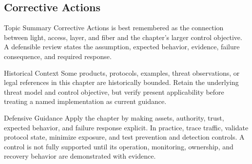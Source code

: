 \documentclass[11pt,letterpaper]{article}
\begin{document}
\subsection*{Corrective Actions}
\begin{CornellNotesTable}
\end{CornellNotesTable}
\begin{CornellSummaryBox}{Topic Summary}
Corrective Actions is best remembered as the connection between light, access, layer, and fiber and the chapter's larger control objective. A defensible review states the assumption, expected behavior, evidence, failure consequence, and required response.
\end{CornellSummaryBox}
\begin{CornellWarningBox}{Historical Context}
Some products, protocols, examples, threat observations, or legal references in this chapter are historically bounded. Retain the underlying threat model and control objective, but verify present applicability before treating a named implementation as current guidance.
\end{CornellWarningBox}
\begin{CornellOverviewBox}{Defensive Guidance}
Apply the chapter by making assets, authority, trust, expected behavior, and failure response explicit. In practice, trace traffic, validate protocol state, minimize exposure, and test prevention and detection controls. A control is not fully supported until its operation, monitoring, ownership, and recovery behavior are demonstrated with evidence.
\end{CornellOverviewBox}
\end{document}
